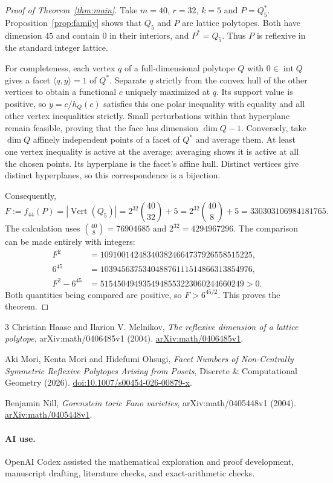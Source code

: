 \documentclass[11pt]{article}
\newcommand{\inte}{\operatorname{int}}
\newcommand{\vertices}{\operatorname{Vert}}
\begin{document}
\begin{proof}[Proof of Theorem~\ref{thm:main}]
Take $m=40$, $r=32$, $k=5$ and $P=Q_5^*$.
Proposition~\ref{prop:family} shows that $Q_5$ and $P$ are lattice
polytopes. Both have dimension $45$ and contain $0$ in their interiors,
and $P^*=Q_5$. Thus $P$ is reflexive in the standard integer lattice.

For completeness, each vertex $q$ of a full-dimensional polytope $Q$ with
$0\in\inte Q$ gives a facet $\langle q,y\rangle=1$ of $Q^*$.
Separate $q$ strictly from the convex hull of the other vertices to obtain
a functional $c$ uniquely maximized at $q$. Its support value is positive,
so $y=c/h_Q(c)$ satisfies this one polar inequality with equality and all
other vertex inequalities strictly. Small perturbations within that
hyperplane remain feasible, proving that the face has dimension
$\dim Q-1$. Conversely, take $\dim Q$ affinely independent points of a
facet of $Q^*$ and average them. At least one vertex inequality is active
at the average; averaging shows it is active at all the chosen points.
Its hyperplane is the facet's affine hull. Distinct vertices give distinct
hyperplanes, so this correspondence is a bijection.

Consequently,
\[
 F:=f_{44}(P)=|\vertices(Q_5)|
   =2^{32}\binom{40}{32}+5
   =2^{32}\binom{40}{8}+5
   =330303106984181765.
\]
The calculation uses $\binom{40}{8}=76904685$ and $2^{32}=4294967296$.
The comparison can be made entirely with integers:
\begin{align*}
 F^2&=109100142483403824664737926558515225,\\
 6^{45}&=103945637534048876111514866313854976,\\
 F^2-6^{45}&=5154504949354948553223060244660249>0.
\end{align*}
Both quantities being compared are positive, so $F>6^{45/2}$.
This proves the theorem.
\end{proof}

\begin{thebibliography}{3}
Christian Haase and Ilarion V. Melnikov,
\emph{The reflexive dimension of a lattice polytope},
arXiv:math/0406485v1 (2004).
\href{https://arxiv.org/abs/math/0406485v1}{arXiv:math/0406485v1}.

Aki Mori, Kenta Mori and Hidefumi Ohsugi,
\emph{Facet Numbers of Non-Centrally Symmetric Reflexive Polytopes Arising
from Posets}, Discrete \& Computational Geometry (2026).
\href{https://doi.org/10.1007/s00454-026-00879-x}{doi:10.1007/s00454-026-00879-x}.

Benjamin Nill, \emph{Gorenstein toric Fano varieties},
arXiv:math/0405448v1 (2004).
\href{https://arxiv.org/abs/math/0405448v1}{arXiv:math/0405448v1}.
\end{thebibliography}

\paragraph{AI use.}
OpenAI Codex assisted the mathematical exploration and proof development,
manuscript drafting, literature checks, and exact-arithmetic checks.
\end{document}
